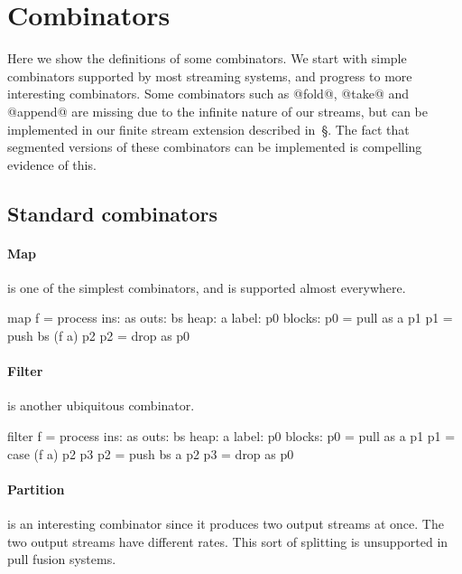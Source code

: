 \appendix
\section{Combinators}
\label{s:Combinators}

Here we show the definitions of some combinators.
We start with simple combinators supported by most streaming systems, and progress to more interesting combinators.
Some combinators such as @fold@, @take@ and @append@ are missing due to the infinite nature of our streams, but can be implemented in our finite stream extension described in~\S\REF.
The fact that segmented versions of these combinators can be implemented is compelling evidence of this.

\subsection{Standard combinators}

\paragraph{Map} is one of the simplest combinators, and is supported almost everywhere.

\begin{code}
map f = process
     ins: as
    outs: bs
    heap: {a}
   label: p0
  blocks: p0 = pull as    a  p1
          p1 = push bs (f a) p2
          p2 = drop as       p0
\end{code}

\paragraph{Filter} is another ubiquitous combinator.

\begin{code}
filter f = process
     ins: as
    outs: bs
    heap: {a}
   label: p0
  blocks: p0 = pull as    a  p1
          p1 = case    (f a) p2 p3
          p2 = push bs    a  p2
          p3 = drop as       p0
\end{code}

\paragraph{Partition} is an interesting combinator since it produces two output streams at once.
The two output streams have different rates.
This sort of splitting is unsupported in pull fusion systems.

